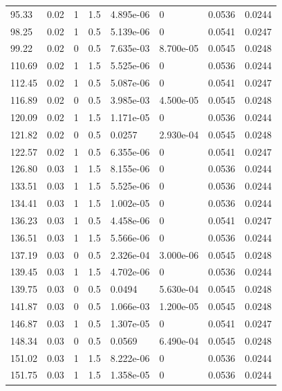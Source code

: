 \documentclass[preview]{standalone}
\begin{document}
{{\begin{tabular}{L{1.2cm}C{1.2cm} C{0.3cm}C{0.5cm} C{1.4cm}C{1.4cm} C{1.4cm}C{1.4cm}}
  95.33  &  0.02  & 1     & 1.5 &  4.895e-06  & 0  & 0.0536 &  0.0244   \\ 
  98.25  &  0.02  & 1     & 0.5 &  5.139e-06  & 0  & 0.0541 &  0.0247   \\ 
  99.22  &  0.02  & 0     & 0.5 &  7.635e-03  & 8.700e-05  & 0.0545 &  0.0248   \\ 
  110.69  &  0.02  & 1     & 1.5 &  5.525e-06  & 0  & 0.0536 &  0.0244   \\ 
  112.45  &  0.02  & 1     & 0.5 &  5.087e-06  & 0  & 0.0541 &  0.0247   \\ 
  116.89  &  0.02  & 0     & 0.5 &  3.985e-03  & 4.500e-05  & 0.0545 &  0.0248   \\ 
  120.09  &  0.02  & 1     & 1.5 &  1.171e-05  & 0  & 0.0536 &  0.0244   \\ 
  121.82  &  0.02  & 0     & 0.5 &  0.0257  & 2.930e-04  & 0.0545 &  0.0248   \\ 
  122.57  &  0.02  & 1     & 0.5 &  6.355e-06  & 0  & 0.0541 &  0.0247   \\ 
  126.80  &  0.03  & 1     & 1.5 &  8.155e-06  & 0  & 0.0536 &  0.0244   \\ 
  133.51  &  0.03  & 1     & 1.5 &  5.525e-06  & 0  & 0.0536 &  0.0244   \\ 
  134.41  &  0.03  & 1     & 1.5 &  1.002e-05  & 0  & 0.0536 &  0.0244   \\ 
  136.23  &  0.03  & 1     & 0.5 &  4.458e-06  & 0  & 0.0541 &  0.0247   \\ 
  136.51  &  0.03  & 1     & 1.5 &  5.566e-06  & 0  & 0.0536 &  0.0244   \\ 
  137.19  &  0.03  & 0     & 0.5 &  2.326e-04  & 3.000e-06  & 0.0545 &  0.0248   \\ 
  139.45  &  0.03  & 1     & 1.5 &  4.702e-06  & 0  & 0.0536 &  0.0244   \\ 
  139.75  &  0.03  & 0     & 0.5 &  0.0494  & 5.630e-04  & 0.0545 &  0.0248   \\ 
  141.87  &  0.03  & 0     & 0.5 &  1.066e-03  & 1.200e-05  & 0.0545 &  0.0248   \\ 
  146.87  &  0.03  & 1     & 0.5 &  1.307e-05  & 0  & 0.0541 &  0.0247   \\ 
  148.34  &  0.03  & 0     & 0.5 &  0.0569  & 6.490e-04  & 0.0545 &  0.0248   \\ 
  151.02  &  0.03  & 1     & 1.5 &  8.222e-06  & 0  & 0.0536 &  0.0244   \\ 
  151.75  &  0.03  & 1     & 1.5 &  1.358e-05  & 0  & 0.0536 &  0.0244   \\ 

\end{tabular}}}
\end{document}
